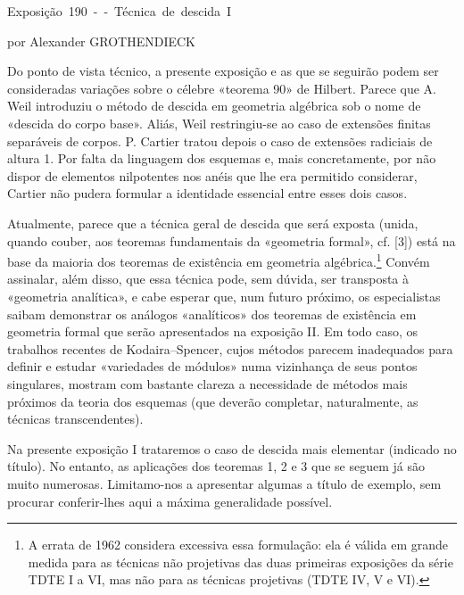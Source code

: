 \unit{Exposição 190 -- Técnica de descida I}
%
  {por Alexander GROTHENDIECK}

Do ponto de vista técnico, a presente exposição e as que se seguirão podem
ser consideradas variações sobre o célebre «teorema 90» de Hilbert.
Parece que A. Weil introduziu o método de descida em geometria algébrica sob
o nome de «descida do corpo base». Aliás, Weil restringiu-se ao caso de
extensões finitas separáveis de corpos. P. Cartier tratou depois o caso de
extensões radiciais de altura 1. Por falta da linguagem dos esquemas e,
mais concretamente, por não dispor de elementos nilpotentes nos anéis que
lhe era permitido considerar, Cartier não pudera formular a identidade
essencial entre esses dois casos.

Atualmente, parece que a técnica geral de descida que será exposta (unida,
quando couber, aos teoremas fundamentais da «geometria formal», cf. [3])
está na base da maioria dos teoremas de existência em geometria
algébrica.\footnote{A errata de 1962 considera excessiva essa formulação: ela é
válida em grande medida para as técnicas não projetivas das duas primeiras
exposições da série TDTE I a VI, mas não para as técnicas projetivas (TDTE IV,
V e VI).} Convém assinalar, além disso, que essa técnica pode, sem dúvida, ser
transposta à «geometria analítica», e cabe esperar que, num futuro próximo,
os especialistas saibam demonstrar os análogos «analíticos» dos teoremas de
existência em geometria formal que serão apresentados na exposição II. Em
todo caso, os trabalhos recentes de Kodaira--Spencer, cujos métodos parecem
inadequados para definir e estudar «variedades de módulos» numa vizinhança
de seus pontos singulares, mostram com bastante clareza a necessidade de
métodos mais próximos da teoria dos esquemas (que deverão completar,
naturalmente, as técnicas transcendentes).

Na presente exposição I trataremos o caso de descida mais elementar (indicado
no título). No entanto, as aplicações dos teoremas 1, 2 e 3 que se seguem já
são muito numerosas. Limitamo-nos a apresentar algumas a título de exemplo,
sem procurar conferir-lhes aqui a máxima generalidade possível.

